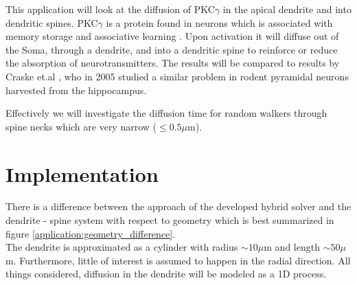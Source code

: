 \noindent This application will look at the diffusion of PKC$\gamma$ in the apical dendrite and into dendritic spines. 
PKC$\gamma$ is a protein found in neurons which is associated with memory storage and associative learning \cite{saito2002protein}. 
Upon activation it will diffuse out of the Soma, through a dendrite, and into a dendritic spine to reinforce or reduce the absorption of neurotransmitters. 
The results will be compared to results by Craske et.al \cite{craske2005spines}, who in 2005 studied a similar problem in rodent pyramidal neurons harvested from the hippocampus.

Effectively we will investigate the diffusion time for random walkers through spine necks which are very narrow ($\leq0.5\mu$m). 

\section{Implementation}

There is a difference between the approach of the developed hybrid solver and the dendrite - spine system with respect to geometry which is best summarized in figure \ref{application:geometry_difference}.\\

\noindent The dendrite is approximated as a cylinder with radius $\sim10\mu$m and length $\sim50\mu$m. Furthermore, little of interest is assumed to happen in the radial direction. All things considered, diffusion in the dendrite will be modeled as a 1D process. \\

